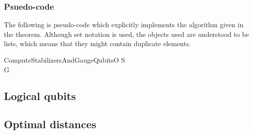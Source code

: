 \documentclass[twocolumn,showpacs,preprintnumbers,amsmath,amssymb,nofootinbib,pra,floatfix]{revtex4}
\begin{document}
\subsubsection{Psuedo-code}

The following is pseudo-code which explicitly implements the algorithm given in the theorem.  Although set notation is used, the objects used are understood to be lists, which means that they might contain duplicate elements.

\begin{pseudocode}{ComputeStabilizersAndGaugeQubits}{O}
S \GETS {}\\
G \GETS {}
\end{pseudocode}
\subsection{Logical qubits}

\label{logical-qubits}
\subsection{Optimal distances}

\label{optimal-distances}
\end{document}
